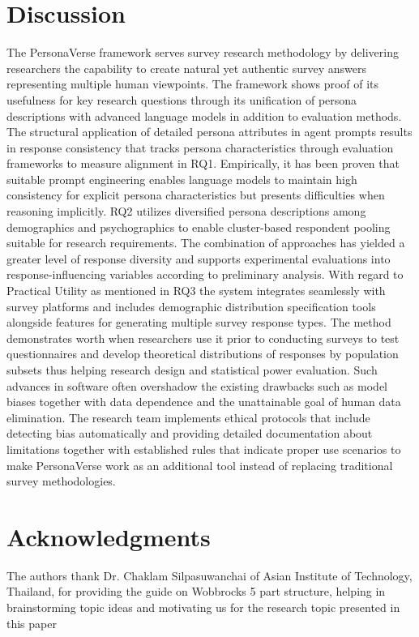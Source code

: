\documentclass[11pt]{article}
\begin{document}
\section{Discussion}

The PersonaVerse framework serves survey research methodology by delivering researchers the capability to create natural yet authentic survey answers representing multiple human viewpoints. The framework shows proof of its usefulness for key research questions through its unification of persona descriptions with advanced language models in addition to evaluation methods. The structural application of detailed persona attributes in agent prompts results in response consistency that tracks persona characteristics through evaluation frameworks to measure alignment in RQ1. Empirically, it has been proven that suitable prompt engineering enables language models to maintain high consistency for explicit persona characteristics but presents difficulties when reasoning implicitly. RQ2 utilizes diversified persona descriptions among demographics and psychographics to enable cluster-based respondent pooling suitable for research requirements. The combination of approaches has yielded a greater level of response diversity and supports experimental evaluations into response-influencing variables according to preliminary analysis. With regard to Practical Utility as mentioned in RQ3 the system integrates seamlessly with survey platforms and includes demographic distribution specification tools alongside features for generating multiple survey response types. The method demonstrates worth when researchers use it prior to conducting surveys to test questionnaires and develop theoretical distributions of responses by population subsets thus helping research design and statistical power evaluation. Such advances in software often overshadow the existing drawbacks such as model biases together with data dependence and the unattainable goal of human data elimination. The research team implements ethical protocols that include detecting bias automatically and providing detailed documentation about limitations together with established rules that indicate proper use scenarios to make PersonaVerse work as an additional tool instead of replacing traditional survey methodologies.

\section*{Acknowledgments}

The authors thank Dr. Chaklam Silpasuwanchai of Asian Institute of Technology, Thailand, for providing the guide on Wobbrocks 5 part structure, helping in brainstorming topic ideas and motivating us for the research topic presented in this paper
\end{document}
